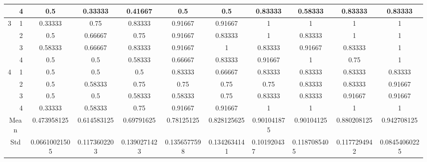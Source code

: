 \documentclass[draft,dvipsnames]{drexel-thesis}
\begin{document}
\begin{thesis}
\begin{table}[!t]
{\begin{tabular}{|c|c|c|c|c|c|c|c|c|c|c|}
                      & 4                   & 0.5           & 0.33333      & 0.41667      & 0.5          & 0.5          & 0.83333                          & 0.58333                           & 0.83333      & 0.83333       \\ \hline
\multirow{4}{*}{3}    & 1                   & 0.33333       & 0.75         & 0.83333      & 0.91667      & 0.91667      & 1                                & 1                                 & 1            & 1             \\ \cline{2-11}
                      & 2                   & 0.5           & 0.66667      & 0.75         & 0.91667      & 0.83333      & 1                                & 0.83333                           & 1            & 1             \\ \cline{2-11}
                      & 3                   & 0.58333       & 0.66667      & 0.83333      & 0.91667      & 1            & 0.83333                          & 0.91667                           & 0.83333      & 1             \\ \cline{2-11}
                      & 4                   & 0.5           & 0.5          & 0.58333      & 0.66667      & 0.83333      & 0.91667                          & 1                                 & 0.75         & 1             \\ \hline
\multirow{4}{*}{4}    & 1                   & 0.5           & 0.5          & 0.5          & 0.83333      & 0.66667      & 0.83333                          & 0.83333                           & 0.83333      & 0.83333       \\ \cline{2-11}
                      & 2                   & 0.5           & 0.58333      & 0.75         & 0.75         & 0.75         & 0.75                             & 0.83333                           & 0.83333      & 0.91667       \\ \cline{2-11}
                      & 3                   & 0.5           & 0.5          & 0.58333      & 0.58333      & 0.75         & 0.83333                          & 0.83333                           & 0.91667      & 0.91667       \\ \cline{2-11}
                      & 4                   & 0.33333       & 0.58333      & 0.75         & 0.91667      & 0.91667      & 1                                & 1                                 & 1            & 1             \\ \hline
\multicolumn{2}{|c|}{Mean}                  & 0.473958125   & 0.614583125  & 0.69791625   & 0.78125125   & 0.828125625  & 0.901041875                      & 0.90104125                        & 0.880208125  & 0.942708125   \\ \hline
\multicolumn{2}{|c|}{Std}                   & 0.06610021505 & 0.1173602203 & 0.1390271423 & 0.1356577598 & 0.1342634141 & \multicolumn{1}{l|}{0.101920437} & \multicolumn{1}{l|}{0.1187085405} & 0.1177294942 & 0.08454060225 \\ \hline
\end{tabular}}
\end{table}


\end{thesis}
\end{document}
